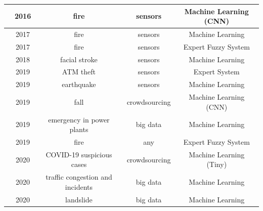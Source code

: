\begin{refsection}
\begin{table}
\begin{tabular}{|c|c|c|c|c|}
    \hline
    \citeauthor{CNNFireVideo} \cite{CNNFireVideo} & 2016 & fire & sensors & Machine Learning (CNN) \\
    
    \hline
    \citeauthor{SultanMahmud2017} \cite{SultanMahmud2017} & 2017 & fire & sensors & Machine Learning \\
    
    \hline
    \citeauthor{FuzzyFire2} \cite{FuzzyFire2} & 2017 & fire & sensors & Expert Fuzzy System \\
    
    \hline
    \citeauthor{MachineFacialStroke} \cite{MachineFacialStroke} & 2018 & facial stroke & sensors & Machine Learning \\
    
    \hline
    \citeauthor{ExpertATM1} \cite{ExpertATM1} & 2019 & ATM theft & sensors & Expert System \\
    
    \hline
    \citeauthor{Chin:2019} \cite{Chin:2019} & 2019 & earthquake & sensors & Machine Learning \\
    
    \hline
    \citeauthor{cnn1} \cite{cnn1} & 2019 & fall & crowdsourcing & Machine Learning (CNN) \\
    
    \hline
    \citeauthor{machine1} \cite{machine1} & 2019 & emergency in power plants & big data & Machine Learning \\

    \hline
    \citeauthor{ExpertFire2} \cite{ExpertFire2} & 2019 & fire & any & Expert Fuzzy System \\
    
    \hline
    \citeauthor{TinyMachineCovid} \cite{TinyMachineCovid} & 2020 & COVID-19 suspicious cases & crowdsourcing & Machine Learning (Tiny) \\
    
    
    \hline
    \citeauthor{machine2} \cite{machine2} & 2020 & traffic congestion and incidents & 
    big data & Machine Learning \\
    
    \hline
    \citeauthor{BRAGAGNOLO2020104240} \cite{BRAGAGNOLO2020104240} & 2020 & landslide & big data & Machine Learning \\
    

\end{tabular}
\end{table}
\end{refsection}
